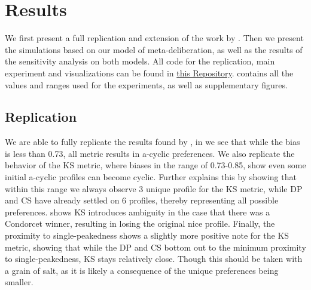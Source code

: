 \newpage
\chapter{Results}
\label{experiment_results}
We first present a full replication and extension of the work by
\citet{radDeliberationSinglePeakednessCoherent2021}. Then we present the simulations based on our model of
meta-deliberation, as well as the results of the sensitivity analysis on both
models. All code for the replication, main experiment and visualizations can be
found in \href{https://github.com/amirsahrani/master_thesis}{this Repository}.  contains all the values and ranges used for the experiments, as well as supplementary figures.


\section{Replication} We are able to fully replicate the results found by
\citet{radDeliberationSinglePeakednessCoherent2021},  in 
we see that while the bias is less than 0.73, all metric results in a-cyclic
preferences. We also replicate the behavior of the KS metric, where biases in
the range of 0.73-0.85, show even some initial a-cyclic profiles can become
cyclic.  Further explains this by showing that within this
range we always observe 3 unique profile for the KS metric, while DP and CS
have already settled on 6 profiles, thereby representing all possible
preferences.  shows KS introduces ambiguity in the case
that there was a Condorcet winner, resulting in losing the original nice
profile. Finally, the proximity to single-peakedness shows a slightly more
positive note for the KS metric, showing that while the DP and CS bottom out to
the minimum proximity to single-peakedness, KS stays relatively close. Though
this should be taken with a grain of salt, as it is likely a consequence of the
unique preferences being smaller.

